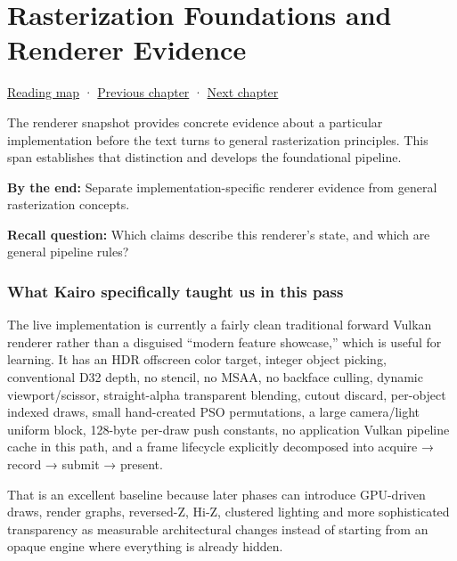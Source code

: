 \chapter{Rasterization Foundations and Renderer Evidence}\label{03-visual-computing-i-ch015-rasterization-foundations-and-renderer-evidence}\hypertarget{03-visual-computing-i-ch015}{}\label{stagechapter:03-visual-computing-i-ch015}

\hypertarget{03-visual-computing-i-ch015-rasterization-foundations-and-renderer-evidence}{}

\hyperref[volume-reading-map]{Reading map} · \hyperref[03-visual-computing-i-ch014-transparency-blending-and-visibility]{Previous chapter} · \hyperref[03-visual-computing-i-ch019]{Next chapter}

The renderer snapshot provides concrete evidence about a particular implementation before the text turns to general rasterization principles. This span establishes that distinction and develops the foundational pipeline.

\textbf{By the end:} Separate implementation-specific renderer evidence from general rasterization concepts.

\textbf{Recall question:} Which claims describe this renderer's state, and which are general pipeline rules?

\subsection{What Kairo specifically taught us in this pass}\label{03-visual-computing-i-ch015-what-kairo-specifically-taught-us-in-this-pass}

\hypertarget{03-visual-computing-i-ch015-what-kairo-specifically-taught-us-in-this-pass}{}

The live implementation is currently a fairly clean traditional forward Vulkan renderer rather than a disguised ``modern feature showcase,'' which is useful for learning. It has an HDR offscreen color target, integer object picking, conventional D32 depth, no stencil, no MSAA, no backface culling, dynamic viewport/scissor, straight-alpha transparent blending, cutout discard, per-object indexed draws, small hand-created PSO permutations, a large camera/light uniform block, 128-byte per-draw push constants, no application Vulkan pipeline cache in this path, and a frame lifecycle explicitly decomposed into acquire → record → submit → present.

That is an excellent baseline because later phases can introduce GPU-driven draws, render graphs, reversed-Z, Hi-Z, clustered lighting and more sophisticated transparency as measurable architectural changes instead of starting from an opaque engine where everything is already hidden.

